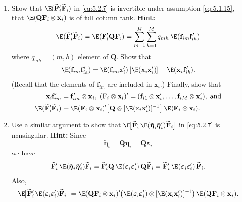 \begin{problemset}
\begin{enumerate}[label=(\alph*)]
\item Show that $\E(\widetilde{\mathbf{F}}_i'\widetilde{\mathbf{F}}_i)$ in \eqref{eq:5.2.7} is invertible under assumption \eqref{eq:5.1.15}, that
  $\E(\mathbf{Q}\mathbf{F}_i \otimes \mathbf{x}_i)$ is of full column rank. \textbf{Hint:}
  \[
    \E(\widetilde{\mathbf{F}}_i'\widetilde{\mathbf{F}}_i)
    = \E(\mathbf{F}_i'\mathbf{Q}\mathbf{F}_i)
    = \sum_{m=1}^{M}\sum_{h=1}^{M}q_{mh}\,\E(\mathbf{f}_{im}\mathbf{f}_{ih}')
  \]
  where $q_{mh} = (m,h)$ element of $\mathbf{Q}$. Show that
  \[
    \E(\mathbf{f}_{im}\mathbf{f}_{ih}')
    = \E(\mathbf{f}_{im}\mathbf{x}_i')\,[\E(\mathbf{x}_i\mathbf{x}_i')]^{-1}\,
      \E(\mathbf{x}_i\mathbf{f}_{ih}').
  \]
  (Recall that the elements of $\mathbf{f}_{im}$ are included in $\mathbf{x}_i$.) Finally, show that
  \begin{align*}
    \mathbf{x}_i\mathbf{f}_{im}' &= \mathbf{f}_{im}' \otimes \mathbf{x}_i,\;
    (\mathbf{F}_i \otimes \mathbf{x}_i)' = (\mathbf{f}_{i1} \otimes \mathbf{x}_i', \ldots,
    \mathbf{f}_{iM} \otimes \mathbf{x}_i'), \text{ and} \\
    \E(\widetilde{\mathbf{F}}_i'\widetilde{\mathbf{F}}_i)
    &= \E(\mathbf{F}_i \otimes \mathbf{x}_i)'\bigl[\mathbf{Q} \otimes [\E(\mathbf{x}_i\mathbf{x}_i')]^{-1}\bigr]
    \,\E(\mathbf{F}_i \otimes \mathbf{x}_i).
  \end{align*}

\item Use a similar argument to show that
  $\E\!\bigl[\widetilde{\mathbf{F}}_i'\,\E(\tilde{\boldsymbol{\eta}}_i\tilde{\boldsymbol{\eta}}_i')\widetilde{\mathbf{F}}_i\bigr]$
  in \eqref{eq:5.2.7} is nonsingular.
  \textbf{Hint:} Since
  \[
    \tilde{\boldsymbol{\eta}}_i = \mathbf{Q}\boldsymbol{\eta}_i = \mathbf{Q}\boldsymbol{\varepsilon}_i
  \]
  we have
  \[
    \widetilde{\mathbf{F}}_i'\,\E(\tilde{\boldsymbol{\eta}}_i\tilde{\boldsymbol{\eta}}_i')\widetilde{\mathbf{F}}_i
    = \widetilde{\mathbf{F}}_i'\mathbf{Q}\,\E(\boldsymbol{\varepsilon}_i\boldsymbol{\varepsilon}_i')\,
      \mathbf{Q}\widetilde{\mathbf{F}}_i
    = \widetilde{\mathbf{F}}_i'\,\E(\boldsymbol{\varepsilon}_i\boldsymbol{\varepsilon}_i')\,\widetilde{\mathbf{F}}_i.
  \]
  Also,
  \[
    \E\!\bigl[\widetilde{\mathbf{F}}_i'\,\E(\boldsymbol{\varepsilon}_i\boldsymbol{\varepsilon}_i')\widetilde{\mathbf{F}}_i\bigr]
    = \E(\mathbf{Q}\mathbf{F}_i \otimes \mathbf{x}_i)'\bigl(\E(\boldsymbol{\varepsilon}_i\boldsymbol{\varepsilon}_i')
    \otimes [\E(\mathbf{x}_i\mathbf{x}_i')]^{-1}\bigr)\,\E(\mathbf{Q}\mathbf{F}_i \otimes \mathbf{x}_i).
  \]


\end{enumerate}
\end{problemset}
